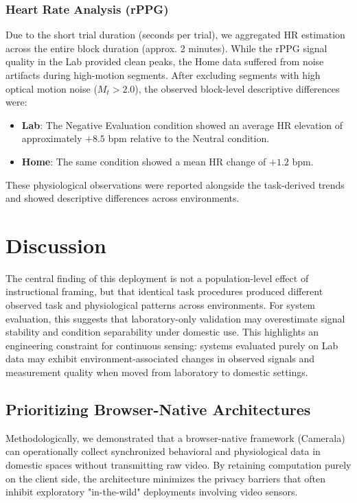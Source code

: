 \documentclass[final,3p,times,twocolumn]{elsarticle}
\begin{document}
\subsubsection{Heart Rate Analysis (rPPG)}
Due to the short trial duration (seconds per trial), we aggregated HR estimation across the entire block duration (approx. 2 minutes).
While the rPPG signal quality in the Lab provided clean peaks, the Home data suffered from noise artifacts during high-motion segments.
After excluding segments with high optical motion noise ($M_t > 2.0$), the observed block-level descriptive differences were:
\begin{itemize}
    \item \textbf{Lab}: The Negative Evaluation condition showed an average HR elevation of approximately $+8.5$ bpm relative to the Neutral condition.
    \item \textbf{Home}: The same condition showed a mean HR change of $+1.2$ bpm.
\end{itemize}
These physiological observations were reported alongside the task-derived trends and showed descriptive differences across environments.

\section{Discussion}

The central finding of this deployment is not a population-level effect of instructional framing, but that identical task procedures produced different observed task and physiological patterns across environments. For system evaluation, this suggests that laboratory-only validation may overestimate signal stability and condition separability under domestic use. This highlights an engineering constraint for continuous sensing: systems evaluated purely on Lab data may exhibit environment-associated changes in observed signals and measurement quality when moved from laboratory to domestic settings.

\subsection{Prioritizing Browser-Native Architectures}
Methodologically, we demonstrated that a browser-native framework (Camerala) can operationally collect synchronized behavioral and physiological data in domestic spaces without transmitting raw video. By retaining computation purely on the client side, the architecture minimizes the privacy barriers that often inhibit exploratory "in-the-wild" deployments involving video sensors.
\end{document}
